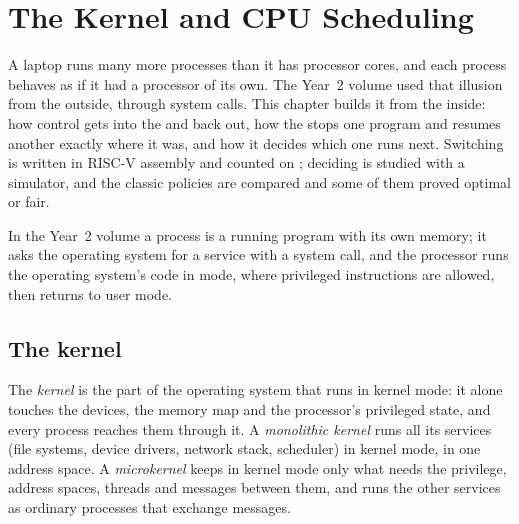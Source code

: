 \chapter{The Kernel and CPU Scheduling}\label{ch:b3:kernel-and-scheduling}

A laptop runs many more processes than it has processor cores, and each process behaves as if it had a processor of its own. The Year~2 volume used that illusion from the outside, through system calls. This chapter builds it from the inside: how control gets into the  and back out, how the  stops one program and resumes another exactly where it was, and how it decides which one runs next. Switching is written in RISC-V assembly and counted on ; deciding is studied with a simulator, and the classic policies are compared and some of them proved optimal or fair.

\begin{recall}
In the Year~2 volume a process is a running program with its own memory; it asks the operating system for a service with a system call, and the processor runs the operating system's code in  mode, where privileged instructions are allowed, then returns to user mode.
\end{recall}

\section{The kernel}\label{sec:b3:kernel-and-scheduling:kernel}

\begin{definition}\label{def:b3:kernel-and-scheduling:kernel}
The \emph{kernel} is the part of the operating system that runs in kernel mode: it alone touches the devices, the memory map and the processor's privileged state, and every process reaches them through it. A \emph{monolithic kernel} runs all its services (file systems, device drivers, network stack, scheduler) in kernel mode, in one address space. A \emph{microkernel} keeps in kernel mode only what needs the privilege, address spaces, threads and messages between them, and runs the other services as ordinary processes that exchange messages.
\end{definition}

